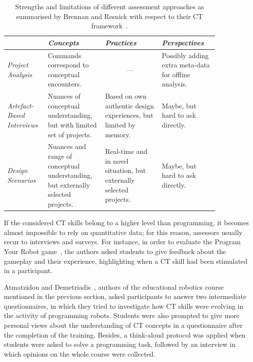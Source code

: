 \begin{table}[ht!]
  \caption{Strengths and limitations of different assessment approaches as summarised by Brennan and Resnick with respect to their \ac{CT} framework~\cite{Brennan:2012}.}\label{tab:reis}
  \centering
  \begin{tabular}{M{0.13\linewidth}m{0.245\linewidth}m{0.245\linewidth}m{0.245\linewidth}}
    \toprule
    & \textit{Concepts} & \textit{Practices} & \textit{Perspectives} \\
    \midrule
    \textit{Project Analysis} & Com\-mands cor\-re\-spond to con\-cep\-tu\-al en\-coun\-ters. &  & Pos\-si\-bly add\-ing ex\-tra me\-ta-da\-ta for off\-line a\-nal\-y\-sis. \\
    \textit{Artefact-Based Interviews} & Nu\-ances of con\-cep\-tu\-al un\-der\-stand\-ing, but with limited set of projects. & Based on own au\-then\-tic de\-sign ex\-pe\-ri\-ences, but lim\-it\-ed by mem\-o\-ry. & Maybe, but hard to ask directly. \\
    \textit{Design Scenarios} & Nu\-ances and range of con\-cep\-tu\-al un\-der\-stand\-ing, but externally selected projects. & Real-time and in novel situation, but externally selected projects. & Maybe, but hard to ask directly. \\
    \bottomrule
  \end{tabular}
\end{table}

If the considered \ac{CT} skills belong to a higher level than programming, it becomes almost impossible to rely on quantitative data; for this reason, assessors usually recur to interviews and surveys. For instance, in order to evaluate the Program Your Robot game~\cite{kazimoglu2012serious}, the authors asked students to give feedback about the gameplay and their experience, highlighting when a \ac{CT} skill had been stimulated in a participant.

Atmatzidou and Demetriadis~\cite{Atmatzidou:2016}, authors of the educational robotics course mentioned in the previous section, asked participants to answer two intermediate questionnaires, in which they tried to investigate how \ac{CT} skills were evolving in the activity of programming robots. Students were also prompted to give more personal views about the understanding of \ac{CT} concepts in a questionnaire after the completion of the training. Besides, a think-aloud protocol was applied when students were asked to solve a programming task, followed by an interview in which opinions on the whole course were collected.

